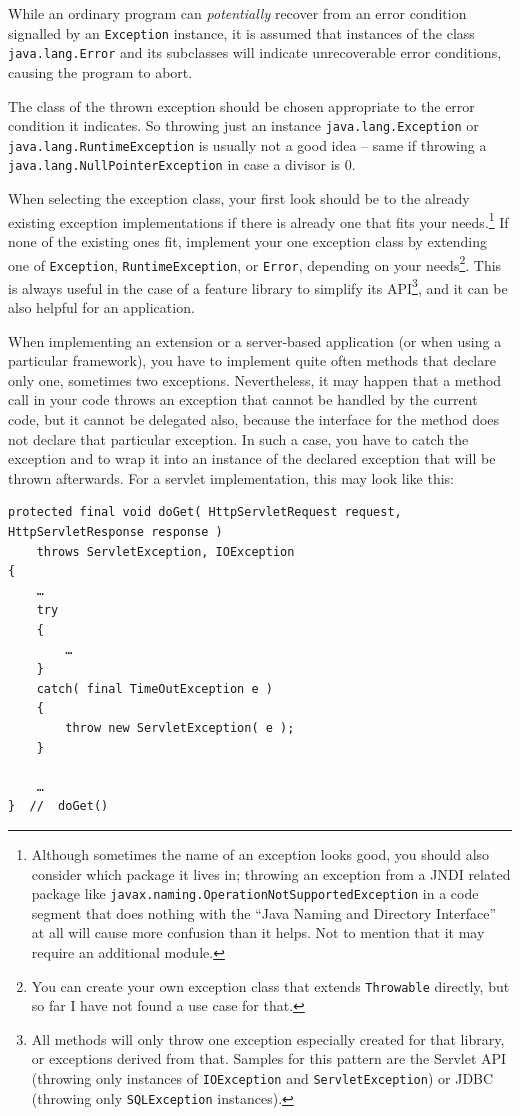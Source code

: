 \documentclass[11pt,a4paper, titlepage, parskip=half, headsepline, footsepline, cleardoublepage=current, headheight=1cm]{scrbook}
\begin{document}
While an ordinary program can \textit{potentially} recover from an error condition signalled by an \lstinline|Exception| instance, it is assumed that instances of the class \lstinline|java.lang.Error| and its subclasses will indicate unrecoverable error conditions, causing the program to abort.

The class of the thrown exception should be chosen appropriate to the error condition it indicates. So throwing just an instance  \lstinline|java.lang.Exception| or \lstinline|java.lang.RuntimeException| is usually not a good idea – same if throwing a \lstinline|java.lang.NullPointerException| in case a divisor is 0.

When selecting the exception class, your first look should be to the already existing exception implementations if there is already one that fits your needs.\footnote{Although sometimes the name of an exception looks good, you should also consider which package it lives in; throwing an exception from a JNDI related package like \lstinline|javax.naming.OperationNotSupportedException| in a code segment that does nothing with the “Java Naming and Directory Interface” at all will cause more confusion than it helps. Not to mention that it may require an additional module.} If none of the existing ones fit, implement your one exception class by extending one of \lstinline|Exception|, \lstinline|RuntimeException|, or \lstinline|Error|, depending on your needs\footnote{You can create your own exception class that extends \lstinline|Throwable| directly, but so far I have not found a use case for that.}. This is always useful in the case of a feature library to simplify its API\footnote{All methods will only throw one exception especially created for that library, or exceptions derived from that. Samples for this pattern are the Servlet API (throwing only instances of \lstinline|IOException| and \lstinline|ServletException|) or JDBC (throwing only \lstinline|SQLException| instances).}, and it can be also helpful for an application.

When implementing an extension or a server-based application (or when using a particular framework), you have to implement quite often methods that declare only one, sometimes two exceptions. Nevertheless, it may happen that a method call in your code throws an exception that cannot be handled by the current code, but it cannot be delegated also, because the interface for the method does not declare that particular exception. In such a case, you have to catch the exception and to wrap it into an instance of the declared exception that will be thrown afterwards. For a servlet implementation\autocite{JAKARTA_EE_HTTPSERVLET_CLASS}, this may look like this:
\begin{lstlisting}
protected final void doGet( HttpServletRequest request, HttpServletResponse response )
    throws ServletException, IOException
{
    …
    try
    {
        …
    }
    catch( final TimeOutException e )
    {
        throw new ServletException( e );
    }

    …
}  //  doGet()
\end{lstlisting}
\end{document}
